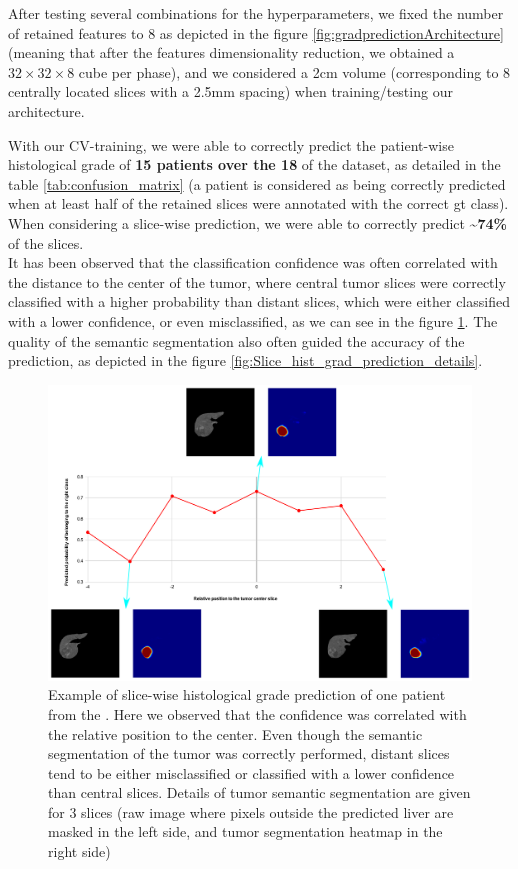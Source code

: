 After testing several combinations for the hyperparameters, we
fixed the number of retained features to 8 as depicted in the
figure \ref{fig:gradpredictionArchitecture} (meaning that after the features dimensionality reduction,
we obtained a $ 32\times32\times8 $ cube per phase), and we considered a 2cm volume
(corresponding to 8 centrally located slices with a 2.5mm spacing) when
training/testing our architecture.

With our CV-training, we were able to correctly predict the patient-wise
histological grade of \textbf{15 patients over the 18} of the dataset, as detailed in the table \ref{tab:confusion_matrix} (a patient is considered as being correctly predicted
when at least half of the retained slices were annotated with the
correct \ac{gt} class).
When considering a slice-wise prediction, we were able to correctly
predict \textbf{\textasciitilde{}74\%} of the slices.\\
It has been observed that the classification confidence was often correlated with the distance to the center of the tumor, where central tumor slices were correctly classified with a higher probability than distant slices, which were either classified with a lower confidence, or even misclassified, as we can see in the figure \ref{fig:Slice_hist_grad_prediction_2}. The quality of the semantic segmentation also often guided the accuracy of the prediction, as depicted in the figure \ref{fig:Slice_hist_grad_prediction_details}.

\begin{figure}[th!]
\centering
\includegraphics[width=0.7\linewidth]{HistologicalGradePrediction/images/Slice_hist_grad_prediction_2}
\caption{Example of slice-wise histological grade prediction of one patient from the . Here we observed that the confidence was correlated with the relative position to the center. Even though the semantic segmentation of the tumor was correctly performed, distant slices tend to be either misclassified or classified with a lower confidence than central slices. Details of tumor semantic segmentation are given for 3 slices (raw image where pixels outside the predicted liver are masked in the left side, and tumor segmentation heatmap in the right side)}
\label{fig:Slice_hist_grad_prediction_2}
\end{figure}


